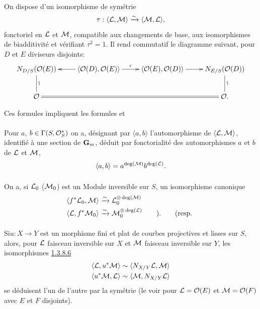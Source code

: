 \documentclass[10pt]{../fichiers-configuration-latex/smfart}
\begin{document}
\paragraph{}
On dispose d'un isomorphisme de symétrie
$$
\tau:\langle {\mathcal L},{\mathcal M}\rangle \xrightarrow{\sim}\langle {\mathcal M},{\mathcal L}\rangle {},
$$
fonctoriel en ${\mathcal L}$ et ${\mathcal M}$, compatible aux
changements de base, aux isomorphismes de biadditivité et vérifiant
$\tau^{2}=1$. Il rend commutatif le diagramme suivant, pour $D$ et $E$
diviseurs disjoints:
$$
\xymatrix{
N_{D/S}(\Oo(E))\ar@{-}[d]^{\text{\rotatebox{90}{$\backsim$}}}& \langle \Oo(D), \Oo(E)\rangle \ar[l]\ar[r]^{\tau} &
\langle \Oo(E), \Oo(D)\rangle  \ar[r]&
N_{E/S}(\Oo(D))\ar@{-}[d]^{\text{\rotatebox{90}{$\backsim$}}}\\
\Oo \ar@{=}[rrr]&    & & \Oo.
}
$$

Ces formules impliquent les formules  
 et

\paragraph{}
Pour $a$, $b\in \Gamma(S,{\mathcal O}^{\ast}_{S})$ on a, désignant par
$\langle a,b\rangle $ l'automorphisme de $\langle {\mathcal L},{\mathcal M}\rangle $, identifié à
une section de $\mathbf{G}_{m}$, déduit par fonctorialité des
automorphismes $a$ et $b$ de ${\mathcal L}$ et ${\mathcal M}$,
$$
\langle a,b\rangle =a^{\deg({\mathcal M})} b^{\deg({\mathcal L})}{}.
$$

\paragraph{}
On a, si ${\mathcal L}_0$ (\resp ${\mathcal M}_0$) est un
Module inversible sur $S$, un isomorphisme canonique
\begin{align*}
\langle f^{\ast}\Ll_0,\Mm\rangle  &\xrightarrow{\sim}
\Ll_0^{\otimes\deg(\Mm)}\\
\langle \Ll,f^{\ast}\Mm_0\rangle  &\xrightarrow{\sim} \Mm_0^{\otimes\deg(\Ll)}\qquad){\quoi}.\tag*{(\resp} 
\end{align*}

\paragraph{}
Si\pageoriginale $u:X\rightarrow Y$ est un morphisme fini et plat de
courbes projectives et lisses sur $S$, alors, pour ${\mathcal L}$
faisceau inversible sur $X$ et ${\mathcal M}$ faisceau inversible sur
$Y$, les isomorphismes \hyperref[XVIII.par1.3.8.6]{1.3.8.6}
\begin{align*}
\langle {\mathcal L},u^{\ast}{\mathcal M}\rangle  &\sim
\langle N_{X/Y}{\mathcal L},{\mathcal M}\rangle \\
\langle u^{\ast}{\mathcal M},{\mathcal L}\rangle  &\sim \langle {\mathcal M},N_{X/Y}{\mathcal L}\rangle 
\end{align*}
se déduisent l'un de l'autre par la symétrie
 (le voir pour
${\mathcal L}={\mathcal O}(E)$ et ${\mathcal M}={\mathcal O}(F)$ avec $E$ et $F$
disjoints).
\end{document}
